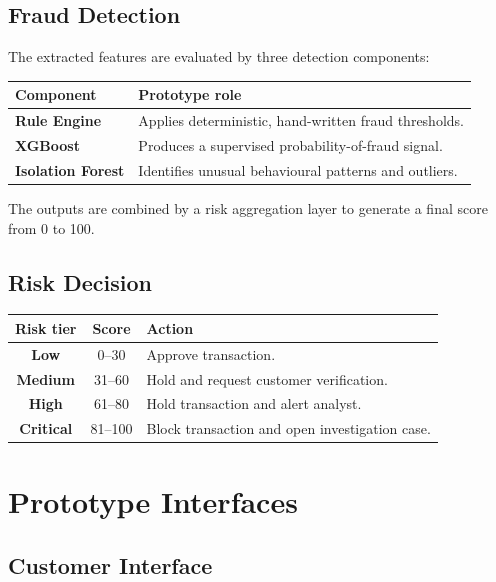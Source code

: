 \documentclass[11pt,a4paper]{article}
\begin{document}
\subsection{Fraud Detection}

The extracted features are evaluated by three detection components:

\begin{center}
\begin{tabularx}{0.92\textwidth}{>{\bfseries}p{}X}
\toprule
Component & Prototype role\\
\midrule
Rule Engine & Applies deterministic, hand-written fraud thresholds.\\
XGBoost & Produces a supervised probability-of-fraud signal.\\
Isolation Forest & Identifies unusual behavioural patterns and outliers.\\
\bottomrule
\end{tabularx}
\end{center}

The outputs are combined by a risk aggregation layer to generate a final score from 0 to 100.

\subsection{Risk Decision}

\begin{center}
\begin{tabular}{>{\bfseries}c c p{}}
\toprule
Risk tier & Score & Action\\
\midrule
Low & 0--30 & Approve transaction.\\
Medium & 31--60 & Hold and request customer verification.\\
High & 61--80 & Hold transaction and alert analyst.\\
Critical & 81--100 & Block transaction and open investigation case.\\
\bottomrule
\end{tabular}
\end{center}

\section{Prototype Interfaces}

\subsection{Customer Interface}
\end{document}
